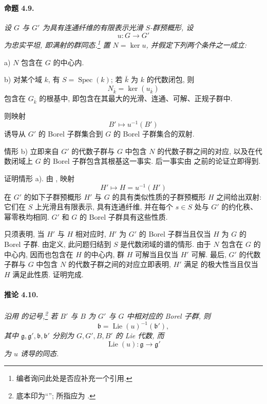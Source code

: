 \paragraph{\textbf{命题 4.9.}}
{\itshape 设 \(G\) 与 \(G'\) 为具有连通纤维的有限表示光滑 \(S\)-群预概形, 设
\[
  u\colon G\longrightarrow G'
\]
为忠实平坦, 即满射的群同态.\footnote{编者询问此处是否应补充一个引用.} 置 \(N=\ker u\), 并假定下列两个条件之一成立:

\smallskip
\noindent
\textup{a)} \(N\) 包含在 \(G\) 的中心内.

\smallskip
\noindent
\textup{b)} 对某个域 \(k\), 有 \(S=\operatorname{Spec}(k)\); 若 \(\bar k\) 为 \(k\) 的代数闭包, 则
\[
  N_{\bar k}=\ker(u_{\bar k})
\]
包含在 \(G_{\bar k}\) 的根基中, 即包含在其最大的光滑、连通、可解、正规子群中.

\smallskip
则映射
\[
  B'\longmapsto u^{-1}(B')
\]
诱导从 \(G'\) 的 Borel 子群集合到 \(G\) 的 Borel 子群集合的双射.}

情形 b) 立即来自 \(G'\) 的代数子群与 \(G\) 中包含 \(N\) 的代数子群之间的对应, 以及在代数闭域上 \(G\) 的 Borel 子群包含其根基这一事实. 后一事实由  之前的论证立即得到.

证明情形 a). 由 , 映射
\[
  H'\longmapsto H=u^{-1}(H')
\]
在 \(G'\) 的如下子群预概形 \(H'\) 与 \(G\) 的具有类似性质的子群预概形 \(H\) 之间给出双射: 它们在 \(S\) 上光滑且有限表示, 具有连通纤维, 并在每个 \(s\in S\) 处与 \(G'\) 的约化秩、幂零秩均相同. \(G'\) 和 \(G\) 的 Borel 子群具有这些性质.

只须表明, 当 \(H'\) 与 \(H\) 相对应时, \(H'\) 为 \(G'\) 的 Borel 子群当且仅当 \(H\) 为 \(G\) 的 Borel 子群. 由定义, 此问题归结到 \(S\) 是代数闭域的谱的情形. 由于 \(N\) 包含在 \(G\) 的中心内, 因而也包含在 \(H\) 的中心内, 群 \(H\) 可解当且仅当 \(H'\) 可解. 最后, \(G'\) 的代数子群与 \(G\) 中包含 \(N\) 的代数子群之间的对应立即表明, \(H'\) 满足 的极大性当且仅当 \(H\) 满足此性质. 证明完成.

\paragraph{\textbf{推论 4.10.}}
{\itshape 沿用  的记号,\footnote{底本印为“”; 所指应为 .} 若 \(B'\) 与 \(B\) 为 \(G'\) 与 \(G\) 中相对应的 Borel 子群, 则
\[
  \mathfrak b=\operatorname{Lie}(u)^{-1}(\mathfrak b'),
\]
其中 \(\mathfrak g,\mathfrak g',\mathfrak b,\mathfrak b'\) 分别为 \(G,G',B,B'\) 的 Lie 代数, 而
\[
  \operatorname{Lie}(u)\colon\mathfrak g\longrightarrow\mathfrak g'
\]
为 \(u\) 诱导的同态.}


